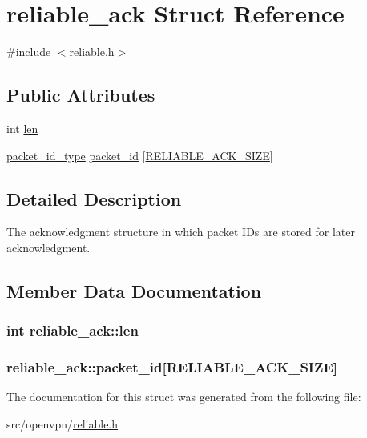 \hypertarget{structreliable__ack}{}\section{reliable\+\_\+ack Struct Reference}
\label{structreliable__ack}


{\ttfamily \#include $<$reliable.\+h$>$}

\subsection*{Public Attributes}
\begin{DoxyCompactItemize}
\item 
int \hyperlink{structreliable__ack_aaa59dbfa83192e660942b149b91e0cc4}{len}
\item 
\hyperlink{packet__id_8h_a345f753b1c6ea20d24409e769aadb7e6}{packet\+\_\+id\+\_\+type} \hyperlink{structreliable__ack_aabd2b845024b78e45bcbc7d6e69cecd2}{packet\+\_\+id} \mbox{[}\hyperlink{group__reliable_ga91ccbc389e490d03321b1a6de0dd096d}{R\+E\+L\+I\+A\+B\+L\+E\+\_\+\+A\+C\+K\+\_\+\+S\+I\+Z\+E}\mbox{]}
\end{DoxyCompactItemize}


\subsection{Detailed Description}
The acknowledgment structure in which packet I\+Ds are stored for later acknowledgment. 

\subsection{Member Data Documentation}
\hypertarget{structreliable__ack_aaa59dbfa83192e660942b149b91e0cc4}{}
\subsubsection[{len}]{\setlength{\rightskip}{0pt plus 5cm}int reliable\+\_\+ack\+::len}\label{structreliable__ack_aaa59dbfa83192e660942b149b91e0cc4}
\hypertarget{structreliable__ack_aabd2b845024b78e45bcbc7d6e69cecd2}{}
\subsubsection[{packet\+\_\+id}]{ reliable\+\_\+ack\+::packet\+\_\+id\mbox{[}{\bf R\+E\+L\+I\+A\+B\+L\+E\+\_\+\+A\+C\+K\+\_\+\+S\+I\+Z\+E}\mbox{]}}\label{structreliable__ack_aabd2b845024b78e45bcbc7d6e69cecd2}


The documentation for this struct was generated from the following file\+:\begin{DoxyCompactItemize}
\item 
src/openvpn/\hyperlink{reliable_8h}{reliable.\+h}\end{DoxyCompactItemize}
